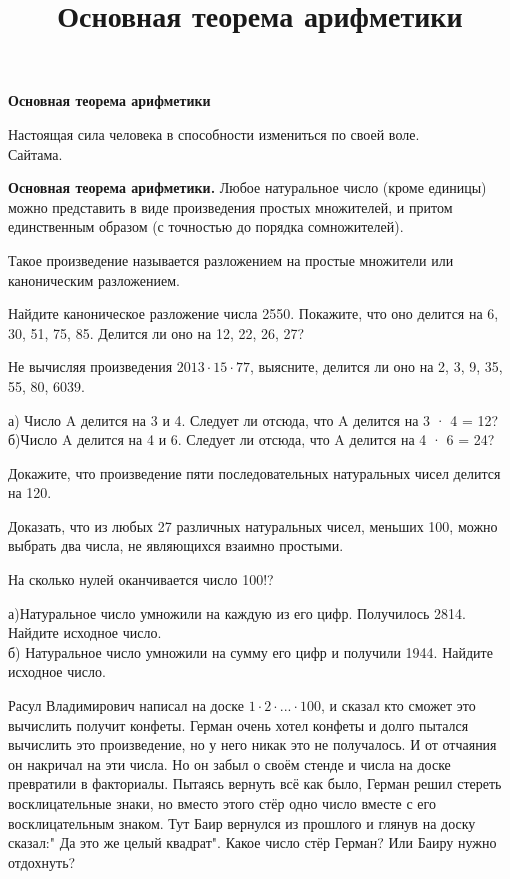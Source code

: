 \centerline{\bf \Huge Основная теорема арифметики}
\title{Основная теорема арифметики}

\begin{flushright}
    \scriptsize Настоящая сила человека в способности измениться по своей воле.\\ Сайтама.
\end{flushright}

\textbf{\Large Основная теорема арифметики.} Любое натуральное число (кроме единицы) можно представить в виде произведения простых множителей, и притом единственным образом (с точностью до порядка сомножителей).

Такое произведение называется разложением на простые множители или каноническим разложением.

Найдите каноническое разложение числа 2550. Покажите, что оно делится на 6, 30, 51, 75, 85. Делится ли оно на 12, 22, 26, 27?

Не вычисляя произведения $2013 \cdot 15 \cdot 77$, выясните, делится ли оно на 2, 3, 9, 35, 55, 80, 6039.

а) Число A делится на 3 и 4. Следует ли отсюда, что A делится на 3 · 4 = 12?\\
б)Число A делится на 4 и 6. Следует ли отсюда, что A делится на 4 · 6 = 24?

Докажите, что произведение пяти последовательных натуральных чисел делится на 120.

Доказать, что из любых 27 различных натуральных чисел, меньших 100, можно выбрать два числа, не являющихся взаимно простыми.

 На сколько нулей оканчивается число 100!?

а)Натуральное число умножили на каждую из его цифр. Получилось 2814. Найдите исходное число.\\
б) Натуральное число умножили на сумму его цифр и получили 1944. Найдите исходное число.

Расул Владимирович написал на доске $1\cdot2\cdot...\cdot100$, и сказал кто сможет это вычислить получит конфеты. Герман очень хотел конфеты и долго пытался вычислить это произведение, но у него никак это не получалось. И от отчаяния он накричал на эти числа. Но он забыл о своём стенде и числа на доске превратили в факториалы. Пытаясь вернуть всё как было, Герман решил стереть восклицательные знаки, но вместо этого стёр одно число вместе с его восклицательным знаком. Тут Баир вернулся из прошлого и глянув на доску сказал:" Да это же целый квадрат". Какое число стёр Герман? Или Баиру нужно отдохнуть? 